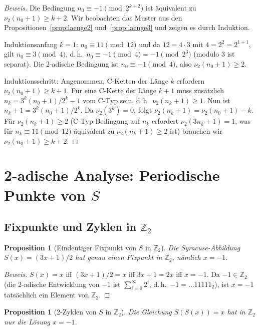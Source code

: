 \documentclass[12pt,a4paper]{article}
\newtheorem{proposition}[definition]{Proposition}
\newenvironment{beweis}{\begin{proof}[Beweis]}{\end{proof}}
\newcommand{\vii}{\nu_2}
\newcommand{\Ztwo}{\mathbb{Z}_2}     %
\begin{document}
\begin{beweis}
Die Bedingung $n_0 \equiv -1 \pmod{2^{k+2}}$ ist äquivalent zu $\vii(n_0+1) \geq k+2$.
Wir beobachten das Muster aus den Propositionen~\ref{prop:laenge2}
und~\ref{prop:laenge3} und zeigen es durch Induktion.

Induktionsanfang $k=1$: $n_0 \equiv 11 \pmod{12}$ und da $12 = 4 \cdot 3$
mit $4 = 2^2 = 2^{1+1}$, gilt $n_0 \equiv 3 \pmod 4$, d.\,h.\
$n_0 \equiv -1 \pmod{4} = -1 \pmod{2^3}$ (modulo 3 ist separat). Die
2-adische Bedingung ist $n_0 \equiv -1 \pmod{4}$, also $\vii(n_0+1)\geq 2$.

Induktionsschritt: Angenommen, C-Ketten der Länge $k$ erfordern $\vii(n_0+1) \geq k+1$.
Für eine C-Kette der Länge $k+1$ muss zusätzlich $n_k = 3^k(n_0+1)/2^k - 1$
vom C-Typ sein, d.\,h.\ $\vii(n_k+1) \geq 1$. Nun ist
$n_k + 1 = 3^k(n_0+1)/2^k$. Da $\vii(3^k) = 0$, folgt
$\vii(n_k+1) = \vii(n_0+1) - k$. Für $\vii(n_k+1) \geq 2$
(C-Typ-Bedingung auf $n_k$ erfordert $\vii(3n_k+1) = 1$, was für
$n_k \equiv 11 \pmod{12}$ äquivalent zu $\vii(n_k+1) \geq 2$ ist)
brauchen wir $\vii(n_0+1) \geq k+2$.
\end{beweis}

\section{2-adische Analyse: Periodische Punkte von $S$}

\subsection{Fixpunkte und Zyklen in $\Ztwo$}

\begin{proposition}[Eindeutiger Fixpunkt von $S$ in $\Ztwo$]
\label{prop:fixpunkt}
Die Syracuse-Abbildung $S(x) = (3x+1)/2$ hat genau einen Fixpunkt in $\Ztwo$,
nämlich $x = -1$.
\end{proposition}

\begin{beweis}
$S(x) = x$ iff $(3x+1)/2 = x$ iff $3x+1 = 2x$ iff $x = -1$. Da $-1 \in \Ztwo$
(die 2-adische Entwicklung von $-1$ ist $\sum_{i=0}^\infty 2^i$, d.\,h.\
$-1 = \ldots 11111_2$), ist $x = -1$ tatsächlich ein Element von $\Ztwo$.
\end{beweis}

\begin{proposition}[2-Zyklen von $S$ in $\Ztwo$]
\label{prop:2zyklus}
Die Gleichung $S(S(x)) = x$ hat in $\Ztwo$ nur die Lösung $x = -1$.
\end{proposition}
\end{document}
